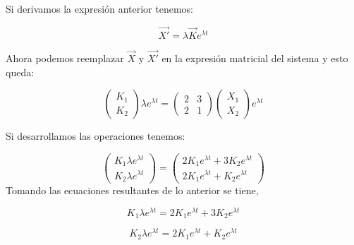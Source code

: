\documentclass[titlepage]{article}
\begin{document}
       Si derivamos la expresión anterior tenemos:
       
       		\begin{equation*}
      			\vec{X'} = \lambda \vec{K}e^{\lambda t}
      		\end{equation*}
      	
       Ahora podemos reemplazar $\vec{X}$ y $\vec{X'}$ en la expresión matricial del sistema y esto queda:
       
       		\begin{equation*}
       			\begin{pmatrix}
       				K_1 \\
       				K_2
       			\end{pmatrix}
       			\lambda e^{\lambda t} =
       			\begin{pmatrix}
       				2 & 3 \\
       				2 & 1 
       			\end{pmatrix}
       			\begin{pmatrix}
       				X_1 \\
       				X_2
       			\end{pmatrix}
       			e^{\lambda t}
       		\end{equation*}
       	
       	Si desarrollamos las operaciones tenemos:
       		
       		\begin{equation*}
       			\begin{pmatrix}
       				K_1\lambda e^{\lambda t}\\
       				K_2\lambda e^{\lambda t}
       			\end{pmatrix}
      			=
      			\begin{pmatrix}
      				2K_1e^{\lambda t} + 3K_2e^{\lambda t}\\
      				2K_1e^{\lambda t} + K_2e^{\lambda t}
      			\end{pmatrix}
      		\end{equation*}
      	 Tomando las ecuaciones resultantes de lo anterior se tiene,
      	 
      	 \begin{equation*}
      	 	K_1\lambda e^{\lambda t} = 2K_1e^{\lambda t} + 3K_2e^{\lambda t}
      	 \end{equation*}
      	 	
      	 \begin{equation*}
      	 	K_2\lambda e^{\lambda t} = 2K_1e^{\lambda t} + K_2e^{\lambda t}
      	 \end{equation*}
      	 
\end{document}
